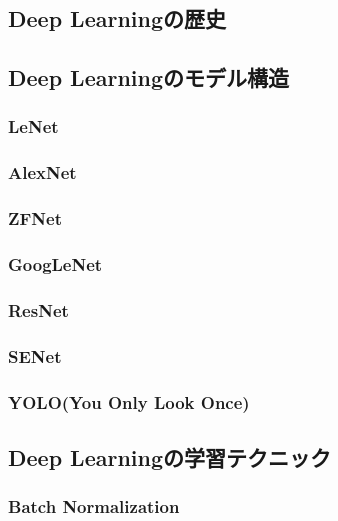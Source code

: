 \subsection{Deep Learningの歴史}


\subsection{Deep Learningのモデル構造}
\subsubsection{LeNet}


\subsubsection{AlexNet}


\subsubsection{ZFNet}


\subsubsection{GoogLeNet}


\subsubsection{ResNet}


\subsubsection{SENet}


\subsubsection{YOLO(You Only Look Once)}


\subsection{Deep Learningの学習テクニック}
\subsubsection{Batch Normalization}


